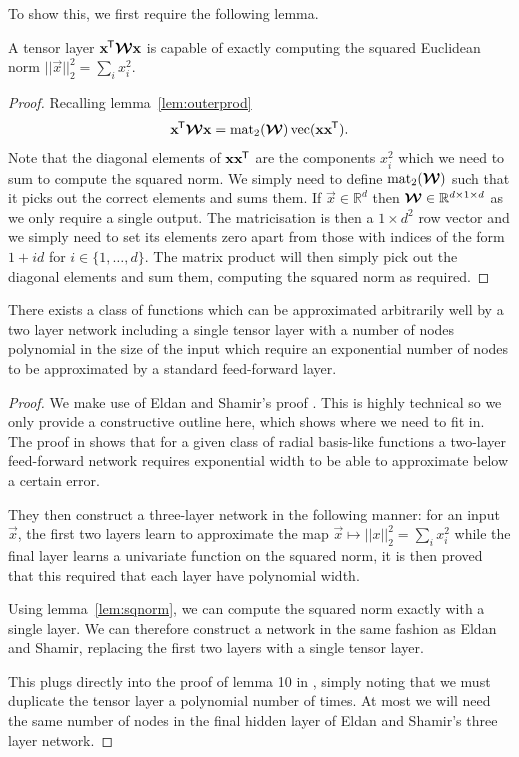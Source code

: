 To show this, we first require the following lemma.
\begin{lem}\label{lem:sqnorm}
	A tensor layer \(\mathbf{x}^{\mkern-1.5mu\mathsf{T}}\bm{\mathcal{W}}\mathbf{x}\) is capable of exactly computing the squared
	Euclidean norm \(||\vec{x}||^2_2 = \sum_i x_i^2\).
\end{lem}
\begin{proof}
Recalling lemma~\ref{lem:outerprod}
\begin{equation} \label{eq:outerquad}
	\mathbf{x}^{\mkern-1.5mu\mathsf{T}}\bm{\mathcal{W}}\mathbf{x} = \operatorname{mat}_2(\bm{\mathcal{W}}) \operatorname{vec}(\mathbf{x}\mathbf{x}^{\mkern-1.5mu\mathsf{T}}).
\end{equation} Note that the diagonal elements of \(\mathbf{x}\mathbf{x}^{\mkern-1.5mu\mathsf{T}}\) are the components
\(x_i^2\) which we need to sum to compute the squared norm. We simply need to define
\(\operatorname{mat}_2(\bm{\mathcal{W}})\) such that it picks out the correct elements and sums them. If 
\(\vec{x} \in \mathbb{R}^d\) then \(\bm{\mathcal{W}} \in \mathbb{R}^{d \times 1 \times d}\) as we only
require a single output. The matricisation is then a \(1 \times d^2\) row vector and we simply need
to set its elements zero apart from those with indices of the form \(1 + id\) for 
\(i \in \{1, \ldots, d\}\). The matrix product will then simply pick out the diagonal elements and
sum them, computing the squared norm as required.
\end{proof}

\begin{thm}
There exists a class of functions which can be approximated arbitrarily well by a two layer network
including a single tensor layer with a number of nodes polynomial in the size of the input which
require an exponential number of nodes to be approximated by a standard feed-forward layer.
\end{thm}
\begin{proof}
We make use of Eldan and Shamir's proof \autocite{Eldan2016}. This is highly technical so we only
provide a constructive outline here, which shows where we need to fit in. The proof in
\autocite{Eldan2016} shows that for a given class of radial basis-like functions a two-layer
feed-forward network requires exponential width to be able to approximate below a certain error.

They then construct a three-layer network in the following manner:
for an input \(\vec{x}\), the first two layers learn to approximate the map 
\(\vec{x}\mapsto ||x||^2_2 = \sum_i x_i^2\) while the final layer learns a univariate function on the
squared norm, it is then proved that this required that each layer have polynomial width.

Using lemma~\ref{lem:sqnorm}, we can compute the squared norm exactly
with a single layer. We can therefore construct a network in
the same fashion as Eldan and Shamir, replacing the first two layers with a single tensor layer. 

This plugs directly into the proof of lemma 10 in \autocite[18--19]{Eldan2016}, simply noting that
we must duplicate the tensor layer a polynomial number of times. At most we will need the same number of
nodes in the final hidden layer of Eldan and Shamir's three layer network.
\end{proof}

